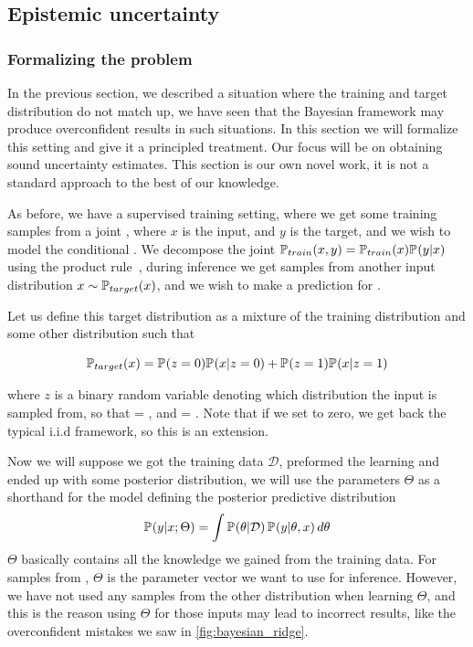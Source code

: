 \documentclass[../main.tex]{subfiles}
\begin{document}
\subsection{Epistemic uncertainty}
\label{sec:epistemic}


\subsubsection{Formalizing the problem}
\label{sec:formalizing}

In the previous section, we described a situation where the training and target distribution do not match up, we have seen that the Bayesian framework may produce overconfident results in such situations. In this section we will formalize this setting and give it a principled treatment. Our focus will be on obtaining sound uncertainty estimates. This section is our own novel work, it is not a standard approach to the best of our knowledge. 

As before, we have a supervised training setting, where we get some training samples from a joint , where $x$ is the input, and $y$ is the target, and we wish to model the conditional . We decompose the joint $\pdf[train]{x,y} = \pdf[train]{x} \pdf{y|x}$ using the product rule~\citep[chapter~2]{mackay2003information}, during inference we get samples from another input distribution $x\sim\pdf[target]{x}$, and we wish to make a prediction for . 

Let us define this target distribution as a mixture of the training distribution and some other distribution such that

\begin{equation}
    \pdf[target]{x} = \pdf{z=0} \pdf{x|z=0} + \pdf{z=1} \pdf[]{x|z=1}
\end{equation}{}

where $z$ is a binary random variable denoting which distribution the input is sampled from, so that  = , and  = . 
Note that if we set  to zero, we get back the typical i.i.d framework, so this is an extension.

Now we will suppose we got the training data $\mathcal{D}$, preformed the learning and ended up with some posterior distribution, we will use the parameters $\Theta$ as a shorthand for the model defining the posterior predictive distribution
$$
    \pdf{y|x; \Theta}=  \int \pdf{\theta | \mathcal{D}}\, \pdf{y|\theta, x} \, d\theta
$$
$\Theta$ basically contains all the knowledge we gained from the training data. For samples from , $\Theta$ is the parameter vector we want to use for inference. However, we have not used any samples from the other distribution  when learning $\Theta$, and this is the reason using $\Theta$ for those inputs may lead to incorrect results, like the overconfident mistakes we saw in \cref{fig:bayesian_ridge}. 
\end{document}
